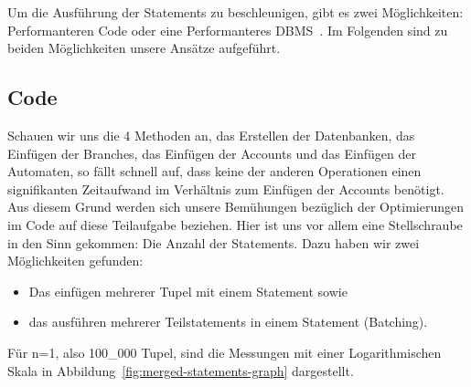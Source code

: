 Um die Ausführung der Statements zu beschleunigen, gibt es zwei Möglichkeiten: Performanteren Code oder eine Performanteres DBMS~. Im Folgenden sind zu beiden Möglichkeiten unsere Ansätze aufgeführt.

\subsection{Code}\label{subsec:code}
Schauen wir uns die 4 Methoden an, das Erstellen der Datenbanken, das Einfügen der Branches, das Einfügen der Accounts und das Einfügen der Automaten, so fällt schnell auf, dass keine der anderen Operationen einen signifikanten Zeitaufwand im Verhältnis zum Einfügen der Accounts benötigt.
Aus diesem Grund werden sich unsere Bemühungen bezüglich der Optimierungen im Code auf diese Teilaufgabe beziehen.
Hier ist uns vor allem eine Stellschraube in den Sinn gekommen: Die Anzahl der Statements.
Dazu haben wir zwei Möglichkeiten gefunden:
\begin{itemize}
    \item Das einfügen mehrerer Tupel mit einem Statement sowie
    \item das ausführen mehrerer Teilstatements in einem Statement (Batching).
\end{itemize}
Für n=1, also 100\_000 Tupel, sind die Messungen mit einer Logarithmischen Skala in Abbildung~\ref{fig:merged-statements-graph} dargestellt.
